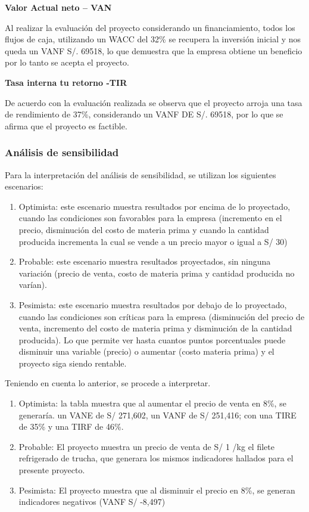 \documentclass[
  stu,
  floatsintext,
  longtable,
  a4paper,
  nolmodern,
  notxfonts,
  notimes,
  colorlinks=true,linkcolor=blue,citecolor=blue,urlcolor=blue]{apa7}
\providecommand{\tightlist}{%
  \setlength{\itemsep}{0pt}\setlength{\parskip}{0pt}}
\begin{document}
\textbf{Valor Actual neto -- VAN}

Al realizar la evaluación del proyecto considerando un financiamiento,
todos los flujos de caja, utilizando un WACC del 32\% se recupera la
inversión inicial y nos queda un VANF S/. 69518, lo que demuestra que la
empresa obtiene un beneficio por lo tanto se acepta el proyecto.

\textbf{Tasa interna tu retorno -TIR}

De acuerdo con la evaluación realizada se observa que el proyecto arroja
una tasa de rendimiento de 37\%, considerando un VANF DE S/. 69518, por
lo que se afirma que el proyecto es factible.

\subsubsection{Análisis de
sensibilidad}\label{anuxe1lisis-de-sensibilidad}

Para la interpretación del análisis de sensibilidad, se utilizan los
siguientes escenarios:

\begin{enumerate}
\def\labelenumi{\arabic{enumi}.}
\tightlist
\item
  Optimista: este escenario muestra resultados por encima de lo
  proyectado, cuando las condiciones son favorables para la empresa
  (incremento en el precio, disminución del costo de materia prima y
  cuando la cantidad producida incrementa la cual se vende a un precio
  mayor o igual a S/ 30)
\item
  Probable: este escenario muestra resultados proyectados, sin ninguna
  variación (precio de venta, costo de materia prima y cantidad
  producida no varían).
\item
  Pesimista: este escenario muestra resultados por debajo de lo
  proyectado, cuando las condiciones son críticas para la empresa
  (disminución del precio de venta, incremento del costo de materia
  prima y disminución de la cantidad producida). Lo que permite ver
  hasta cuantos puntos porcentuales puede disminuir una variable
  (precio) o aumentar (costo materia prima) y el proyecto siga siendo
  rentable.
\end{enumerate}

Teniendo en cuenta lo anterior, se procede a interpretar.

\begin{enumerate}
\def\labelenumi{\arabic{enumi}.}
\tightlist
\item
  Optimista: la tabla muestra que al aumentar el precio de venta en 8\%,
  se generaría. un VANE de S/ 271,602, un VANF de S/ 251,416; con una
  TIRE de 35\% y una TIRF de 46\%.
\item
  Probable: El proyecto muestra un precio de venta de S/ 1 /kg el filete
  refrigerado de trucha, que generara los mismos indicadores hallados
  para el presente proyecto.
\item
  Pesimista: El proyecto muestra que al disminuir el precio en 8\%, se
  generan indicadores negativos (VANF S/ -8,497)
\end{enumerate}
\end{document}
